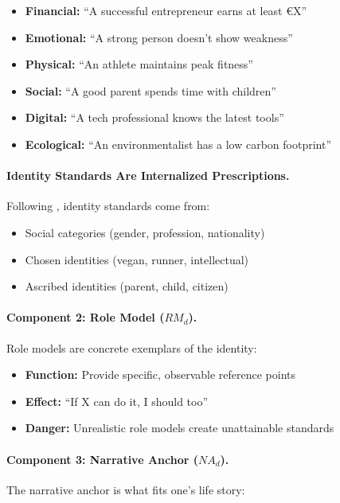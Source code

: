 \begin{itemize}
\item \textbf{Financial:} ``A successful entrepreneur earns at least \euro{X}''
\item \textbf{Emotional:} ``A strong person doesn't show weakness''
\item \textbf{Physical:} ``An athlete maintains peak fitness''
\item \textbf{Social:} ``A good parent spends time with children''
\item \textbf{Digital:} ``A tech professional knows the latest tools''
\item \textbf{Ecological:} ``An environmentalist has a low carbon footprint''
\end{itemize}

\paragraph{Identity Standards Are Internalized Prescriptions.}
Following \citet{akerlofkranton}, identity standards come from:
\begin{itemize}
\item Social categories (gender, profession, nationality)
\item Chosen identities (vegan, runner, intellectual)
\item Ascribed identities (parent, child, citizen)
\end{itemize}

\paragraph{Component 2: Role Model ($RM_d$).}
Role models are concrete exemplars of the identity:

\begin{itemize}
\item \textbf{Function:} Provide specific, observable reference points
\item \textbf{Effect:} ``If X can do it, I should too''
\item \textbf{Danger:} Unrealistic role models create unattainable standards
\end{itemize}

\paragraph{Component 3: Narrative Anchor ($NA_d$).}
The narrative anchor is what fits one's life story:

